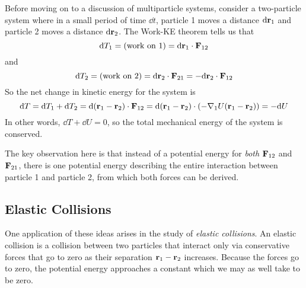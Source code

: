 Before moving on to a discussion of multiparticle systems, consider a two-particle system where in a small period of time $\dd t$, particle 1 moves a distance $\dd \mathbf{r}_1$ and particle 2 moves a distance $\dd \mathbf{r}_2$. The Work-KE theorem tells us that
\[ \dd T_1 = (\text{work on 1}) = \dd \mathbf{r}_1 \cdot \mathbf{F}_{12} \]
and
\[ \dd T_2 = (\text{work on 2}) = \dd \mathbf{r}_2 \cdot \mathbf{F}_{21} = -\dd \mathbf{r}_2 \cdot \mathbf{F}_{12}\]
So the net change in kinetic energy for the system is
\[ \dd T = \dd T_1 + \dd T_2 = \dd (\mathbf{r}_1 - \mathbf{r}_2) \cdot \mathbf{F}_{12} = \dd(\mathbf{r}_1 - \mathbf{r}_2) \cdot (-\nabla_1U(\mathbf{r}_1-\mathbf{r}_2)) = -\dd U\]
In other words, $\dd T + \dd U = 0$, so the total mechanical energy of the system is conserved. 

The key observation here is that instead of a potential energy for \textit{both} $\mathbf{F}_{12}$ and $\mathbf{F}_{21}$, there is one potential energy describing the entire interaction between particle 1 and particle 2, from which both forces can be derived.

\subsection*{Elastic Collisions}
One application of these ideas arises in the study of \textit{elastic collisions}. An elastic collision is a collision between two particles that interact only via conservative forces that go to zero as their separation $\mathbf{r}_1 - \mathbf{r}_2$ increases. Because the forces go to zero, the potential energy approaches a constant which we may as well take to be zero.

